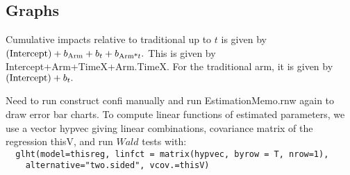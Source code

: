 \subsection{Graphs}

Cumulative impacts relative to traditional up to $t$ is given by $\mbox{(Intercept)}+b_{\mbox{\scriptsize Arm}}+b_{\mbox{\scriptsize $t$}}+b_{\mbox{\scriptsize Arm*$t$}}.$  This is given by \textsf{Intercept+Arm+TimeX+Arm.TimeX}. For the traditional arm, it is given by $\mbox{(Intercept)}+b_{\mbox{\scriptsize $t$}}.$


Need to run construct confi manually and run EstimationMemo.rnw again to draw error bar charts. To compute linear functions of estimated parameters, we use a vector \textsf{hypvec} giving linear combinations, covariance matrix of the regression \textsf{thisV}, and run $Wald$ tests with:\\
{\verb+  glht(model=thisreg, linfct = matrix(hypvec, byrow = T, nrow=1),+ \\
\verb+    alternative="two.sided", vcov.=thisV)+}



